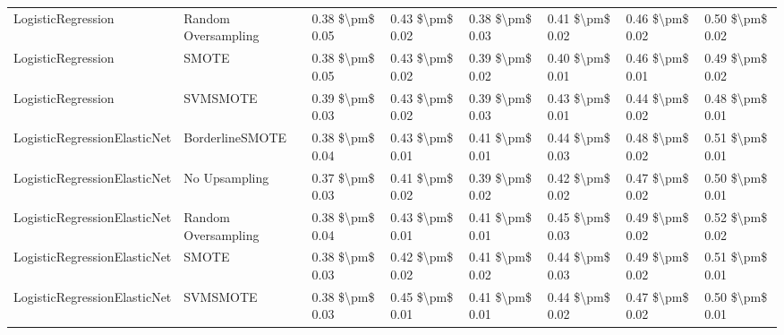 \begin{tabular}{llllllll}
             LogisticRegression &           Random Oversampling & 0.38 \$\textbackslash pm\$ 0.05 &           0.43 \$\textbackslash pm\$ 0.02 &       0.38 \$\textbackslash pm\$ 0.03 &        0.41 \$\textbackslash pm\$ 0.02 &                         0.46 \$\textbackslash pm\$ 0.02 &     0.50 \$\textbackslash pm\$ 0.02 \\
             LogisticRegression &                         SMOTE & 0.38 \$\textbackslash pm\$ 0.05 &           0.43 \$\textbackslash pm\$ 0.02 &       0.39 \$\textbackslash pm\$ 0.02 &        0.40 \$\textbackslash pm\$ 0.01 &                         0.46 \$\textbackslash pm\$ 0.01 &     0.49 \$\textbackslash pm\$ 0.02 \\
             LogisticRegression &                      SVMSMOTE & 0.39 \$\textbackslash pm\$ 0.03 &           0.43 \$\textbackslash pm\$ 0.02 &       0.39 \$\textbackslash pm\$ 0.03 &        0.43 \$\textbackslash pm\$ 0.01 &                         0.44 \$\textbackslash pm\$ 0.02 &     0.48 \$\textbackslash pm\$ 0.01 \\
   LogisticRegressionElasticNet &               BorderlineSMOTE & 0.38 \$\textbackslash pm\$ 0.04 &           0.43 \$\textbackslash pm\$ 0.01 &       0.41 \$\textbackslash pm\$ 0.01 &        0.44 \$\textbackslash pm\$ 0.03 &                         0.48 \$\textbackslash pm\$ 0.02 &     0.51 \$\textbackslash pm\$ 0.01 \\
   LogisticRegressionElasticNet &                 No Upsampling & 0.37 \$\textbackslash pm\$ 0.03 &           0.41 \$\textbackslash pm\$ 0.02 &       0.39 \$\textbackslash pm\$ 0.02 &        0.42 \$\textbackslash pm\$ 0.02 &                         0.47 \$\textbackslash pm\$ 0.02 &     0.50 \$\textbackslash pm\$ 0.01 \\
   LogisticRegressionElasticNet &           Random Oversampling & 0.38 \$\textbackslash pm\$ 0.04 &           0.43 \$\textbackslash pm\$ 0.01 &       0.41 \$\textbackslash pm\$ 0.01 &        0.45 \$\textbackslash pm\$ 0.03 &                         0.49 \$\textbackslash pm\$ 0.02 &     0.52 \$\textbackslash pm\$ 0.02 \\
   LogisticRegressionElasticNet &                         SMOTE & 0.38 \$\textbackslash pm\$ 0.03 &           0.42 \$\textbackslash pm\$ 0.02 &       0.41 \$\textbackslash pm\$ 0.02 &        0.44 \$\textbackslash pm\$ 0.03 &                         0.49 \$\textbackslash pm\$ 0.02 &     0.51 \$\textbackslash pm\$ 0.01 \\
   LogisticRegressionElasticNet &                      SVMSMOTE & 0.38 \$\textbackslash pm\$ 0.03 &           0.45 \$\textbackslash pm\$ 0.01 &       0.41 \$\textbackslash pm\$ 0.01 &        0.44 \$\textbackslash pm\$ 0.02 &                         0.47 \$\textbackslash pm\$ 0.02 &     0.50 \$\textbackslash pm\$ 0.01 \\

\end{tabular}
